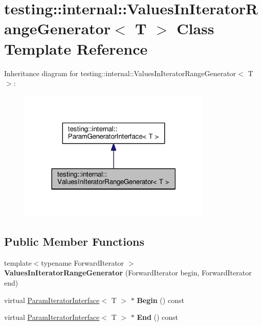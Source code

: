 \hypertarget{classtesting_1_1internal_1_1_values_in_iterator_range_generator}{}\section{testing\+:\+:internal\+:\+:Values\+In\+Iterator\+Range\+Generator$<$ T $>$ Class Template Reference}
\label{classtesting_1_1internal_1_1_values_in_iterator_range_generator}


Inheritance diagram for testing\+:\+:internal\+:\+:Values\+In\+Iterator\+Range\+Generator$<$ T $>$\+:
\nopagebreak
\begin{figure}[H]
\begin{center}
\leavevmode
\includegraphics[width=261pt]{classtesting_1_1internal_1_1_values_in_iterator_range_generator__inherit__graph}
\end{center}
\end{figure}
\subsection*{Public Member Functions}
\begin{DoxyCompactItemize}
\item 
\mbox{\label{classtesting_1_1internal_1_1_values_in_iterator_range_generator_a8b30f6028bc5739bbd7c24b0f0e409f7}} 
{\footnotesize template$<$typename Forward\+Iterator $>$ }\\{\bfseries Values\+In\+Iterator\+Range\+Generator} (Forward\+Iterator begin, Forward\+Iterator end)
\item 
\mbox{\label{classtesting_1_1internal_1_1_values_in_iterator_range_generator_a91dac42f069cd06d05348fe5dd78639b}} 
virtual \mbox{\hyperlink{classtesting_1_1internal_1_1_param_iterator_interface}{Param\+Iterator\+Interface}}$<$ T $>$ $\ast$ {\bfseries Begin} () const
\item 
\mbox{\label{classtesting_1_1internal_1_1_values_in_iterator_range_generator_a4af95b9eccfc86c40a715df2d9d0df40}} 
virtual \mbox{\hyperlink{classtesting_1_1internal_1_1_param_iterator_interface}{Param\+Iterator\+Interface}}$<$ T $>$ $\ast$ {\bfseries End} () const
\end{DoxyCompactItemize}
